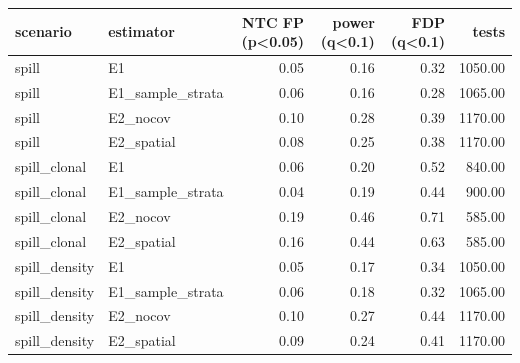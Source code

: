 \begin{tabular}{llrrrr}
\toprule
scenario & estimator & NTC FP (p<0.05) & power (q<0.1) & FDP (q<0.1) & tests \\
\midrule
spill & E1 & 0.05 & 0.16 & 0.32 & 1050.00 \\
spill & E1\_sample\_strata & 0.06 & 0.16 & 0.28 & 1065.00 \\
spill & E2\_nocov & 0.10 & 0.28 & 0.39 & 1170.00 \\
spill & E2\_spatial & 0.08 & 0.25 & 0.38 & 1170.00 \\
spill\_clonal & E1 & 0.06 & 0.20 & 0.52 & 840.00 \\
spill\_clonal & E1\_sample\_strata & 0.04 & 0.19 & 0.44 & 900.00 \\
spill\_clonal & E2\_nocov & 0.19 & 0.46 & 0.71 & 585.00 \\
spill\_clonal & E2\_spatial & 0.16 & 0.44 & 0.63 & 585.00 \\
spill\_density & E1 & 0.05 & 0.17 & 0.34 & 1050.00 \\
spill\_density & E1\_sample\_strata & 0.06 & 0.18 & 0.32 & 1065.00 \\
spill\_density & E2\_nocov & 0.10 & 0.27 & 0.44 & 1170.00 \\
spill\_density & E2\_spatial & 0.09 & 0.24 & 0.41 & 1170.00 \\
\bottomrule
\end{tabular}
